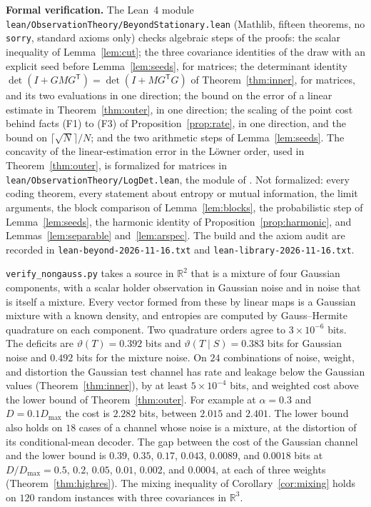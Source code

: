 \documentclass[11pt,onecolumn]{IEEEtran}
\newcommand{\R}{\mathbb{R}}
\begin{document}
\textbf{Formal verification.} The Lean~4 module
\texttt{lean/ObservationTheory/BeyondStationary.lean} (Mathlib, fifteen
theorems, no \texttt{sorry}, standard axioms only) checks algebraic
steps of the proofs: the scalar inequality of Lemma~\ref{lem:cut}; the
three covariance identities of the draw with an explicit seed before
Lemma~\ref{lem:seeds}, for matrices; the determinant identity
$\det(I+GMG^{\mathsf T})=\det(I+MG^{\mathsf T}G)$ of
Theorem~\ref{thm:inner}, for matrices, and its two evaluations in one
direction; the bound on the error of a linear estimate in
Theorem~\ref{thm:outer}, in one direction; the scaling of the point
cost behind facts (F1) to (F3) of Proposition~\ref{prop:rate}, in one
direction, and the bound on $\lceil\sqrt N\rceil/N$; and the two
arithmetic steps of Lemma~\ref{lem:seeds}. The concavity of the
linear-estimation error in the L\"owner order, used in
Theorem~\ref{thm:outer}, is formalized for matrices in
\texttt{lean/ObservationTheory/LogDet.lean}, the module of
\cite{part1}. Not formalized: every coding theorem, every statement
about entropy or mutual information, the limit arguments, the block
comparison of Lemma~\ref{lem:blocks}, the probabilistic step of
Lemma~\ref{lem:seeds}, the harmonic identity of
Proposition~\ref{prop:harmonic}, and Lemmas~\ref{lem:separable}
and~\ref{lem:arspec}. The build and the axiom audit are
recorded in \texttt{lean-beyond-2026-11-16.txt} and
\texttt{lean-library-2026-11-16.txt}.

\texttt{verify\_nongauss.py} takes a source in $\R^2$ that is a mixture
of four Gaussian components, with a scalar holder observation in
Gaussian noise and in noise that is itself a mixture. Every vector
formed from these by linear maps is a Gaussian mixture with a known
density, and entropies are computed by Gauss--Hermite quadrature on
each component. Two quadrature orders agree to $3\times10^{-6}$ bits.
The deficits are $\vartheta(T)=0.392$ bits and
$\vartheta(T\mid S)=0.383$ bits for Gaussian noise and $0.492$ bits for
the mixture noise. On $24$
combinations of noise, weight, and distortion the Gaussian test channel
has rate and leakage below the Gaussian values
(Theorem~\ref{thm:inner}), by at least $5\times10^{-4}$ bits, and
weighted cost above the lower bound of Theorem~\ref{thm:outer}. For
example at $\alpha=0.3$ and $D=0.1D_{\max}$ the cost is $2.282$ bits,
between $2.015$ and $2.401$. The lower bound also holds on $18$ cases
of a channel whose noise is a mixture, at the distortion of its
conditional-mean decoder. The gap between the cost of the Gaussian
channel and the lower bound is $0.39$, $0.35$, $0.17$, $0.043$,
$0.0089$, and $0.0018$ bits at $D/D_{\max}=0.5$, $0.2$, $0.05$, $0.01$,
$0.002$, and $0.0004$, at each of three weights
(Theorem~\ref{thm:highres}). The mixing inequality of
Corollary~\ref{cor:mixing} holds on $120$ random instances with three
covariances in $\R^3$.
\end{document}
